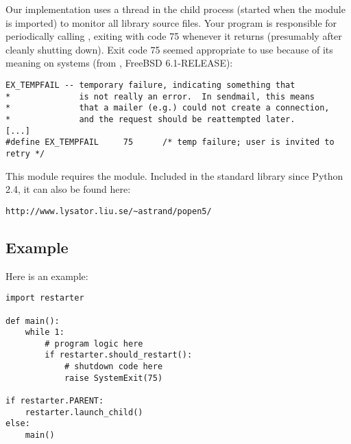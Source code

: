 Our implementation uses a thread in the child process (started when the module
is imported) to monitor all library source files. Your program is responsible
for periodically calling , exiting with code 75 whenever it
returns  (presumably after cleanly shutting down). Exit code 75
seemed appropriate to use because of its meaning on \UNIX{} systems (from
, FreeBSD 6.1-RELEASE):

\begin{verbatim}
EX_TEMPFAIL -- temporary failure, indicating something that
*              is not really an error.  In sendmail, this means
*              that a mailer (e.g.) could not create a connection,
*              and the request should be reattempted later.
[...]
#define EX_TEMPFAIL     75      /* temp failure; user is invited to retry */
\end{verbatim}

This module requires the  module. Included in the standard
library since Python 2.4, it can also be found here:

\begin{verbatim}
http://www.lysator.liu.se/~astrand/popen5/
\end{verbatim}


\subsection{Example \label{example}}

Here is an example:

\begin{verbatim}
import restarter

def main():
    while 1:
        # program logic here
        if restarter.should_restart():
            # shutdown code here
            raise SystemExit(75)

if restarter.PARENT:
    restarter.launch_child()
else:
    main()
\end{verbatim}